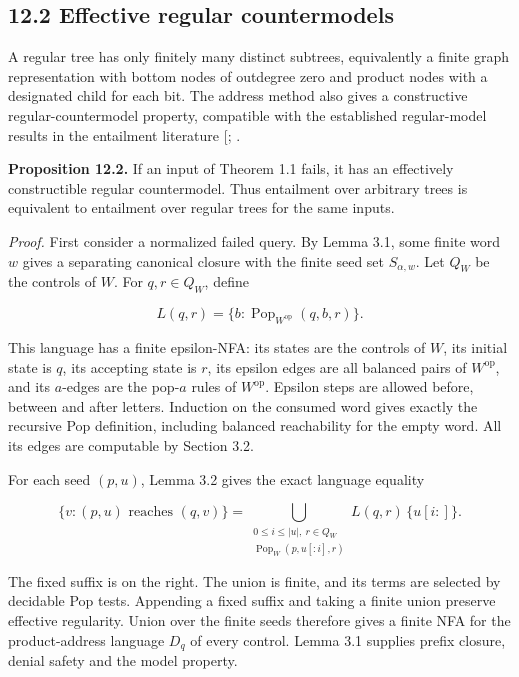 \documentclass[
  11pt,
  a4paper,
]{article}
\begin{document}
\subsection{12.2 Effective regular
countermodels}\label{effective-regular-countermodels}

A regular tree has only finitely many distinct subtrees, equivalently a
finite graph representation with bottom nodes of outdegree zero and
product nodes with a designated child for each bit. The address method
also gives a constructive regular-countermodel property, compatible with
the established regular-model results in the entailment literature
{[}; \citeproc{ref-Memo26}{5}{]}.


\textbf{Proposition 12.2.} If an input of Theorem 1.1 fails, it has an
effectively constructible regular countermodel. Thus entailment over
arbitrary trees is equivalent to entailment over regular trees for the
same inputs.

\emph{Proof.} First consider a normalized failed query. By Lemma 3.1,
some finite word \(w\) gives a separating canonical closure with the
finite seed set \(S_{\alpha,w}\). Let \(Q_W\) be the controls of \(W\).
For \(q,r\in Q_W\), define

\[L(q,r)=\{b:\operatorname{Pop}_{W^{\mathrm{op}}}(q,b,r)\}.\]

This language has a finite epsilon-NFA: its states are the controls of
\(W\), its initial state is \(q\), its accepting state is \(r\), its
epsilon edges are all balanced pairs of \(W^{\mathrm{op}}\), and its
\(a\)-edges are the pop-\(a\) rules of \(W^{\mathrm{op}}\). Epsilon
steps are allowed before, between and after letters. Induction on the
consumed word gives exactly the recursive Pop definition, including
balanced reachability for the empty word. All its edges are computable
by Section 3.2.

For each seed \((p,u)\), Lemma 3.2 gives the exact language equality

\[\{v:(p,u)\text{ reaches }(q,v)\}
=\bigcup_{\substack{0\le i\le |u|,\ r\in Q_W\\
\operatorname{Pop}_W(p,u[:i],r)}} L(q,r)\,\{u[i:]\}.\]

The fixed suffix is on the right. The union is finite, and its terms are
selected by decidable Pop tests. Appending a fixed suffix and taking a
finite union preserve effective regularity. Union over the finite seeds
therefore gives a finite NFA for the product-address language \(D_q\) of
every control. Lemma 3.1 supplies prefix closure, denial safety and the
model property.
\end{document}

